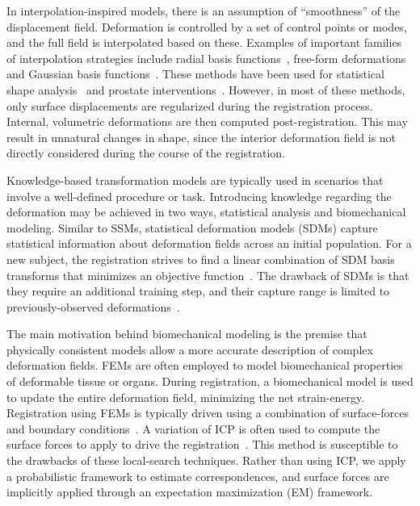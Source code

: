 \documentclass[journal]{IEEEtran}
\begin{document}
In interpolation-inspired models, there is an assumption of ``smoothness'' of the displacement field.  Deformation is controlled by a set of control points or modes, and the full field is interpolated based on these.  Examples of important families of interpolation strategies include radial basis functions~\cite{Chui03a}, free-form deformations~\cite{Wang08a} and Gaussian basis functions~\cite{Myronenko10a}. These methods have been used for statistical shape analysis~\cite{Zhang13a,Rasoulian12b,Achuthan13a} and prostate interventions~\cite{Makni10a,Makni12a}. However, in most of these methods, only surface displacements are regularized during the registration process.  Internal, volumetric deformations are then computed post-registration. This may result in unnatural changes in shape, since the interior deformation field is not directly considered during the course of the registration.

Knowledge-based transformation models are typically used in scenarios that involve a well-defined procedure or task. Introducing knowledge regarding the deformation may be achieved in two ways, statistical analysis and biomechanical modeling. Similar to SSMs, statistical deformation models (SDMs) capture statistical information about deformation fields across an initial population. For a new subject, the registration strives to find a linear combination of SDM basis transforms that minimizes an objective function~\cite{Hu12a,Ashraf02a}. The drawback of SDMs is that they require an additional training step, and their capture range is limited to previously-observed deformations~\cite{Hu12a}.

The main motivation behind biomechanical modeling is the premise that physically consistent models allow a more accurate description of complex deformation fields.  FEMs are often employed to model biomechanical properties of deformable tissue or organs. During registration, a biomechanical model is used to update the entire deformation field, minimizing the net strain-energy.  Registration using FEMs is typically driven using a combination of surface-forces and boundary conditions~\cite{Cash05a,Ferrant01a,Moradi12a,Noe10a,Rucker14a}. A variation of ICP is often used to compute the surface forces to apply to drive the registration~\cite{Ferrant01a,Moradi12a,Rucker14a}.  This method is susceptible to the drawbacks of these local-search techniques. Rather than using ICP, we apply a probabilistic framework to estimate correspondences, and surface forces are implicitly applied through an expectation maximization (EM) framework.  
\end{document}
